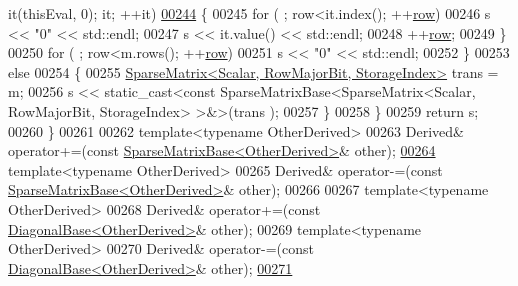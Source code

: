 \begin{DoxyCode}
       it(thisEval, 0); it; ++it)
\hyperlink{group___sparse_core___module_a4d2a17b67327925dc9dab29694f48433}{00244}           \{
00245             \textcolor{keywordflow}{for} ( ; row<it.index(); ++\hyperlink{group___sparse_core___module_ac0a5563ed3f243f013fb9d2c17e230d0}{row})
00246               s << \textcolor{stringliteral}{"0"} << std::endl;
00247             s << it.value() << std::endl;
00248             ++\hyperlink{group___sparse_core___module_ac0a5563ed3f243f013fb9d2c17e230d0}{row};
00249           \}
00250           \textcolor{keywordflow}{for} ( ; row<m.rows(); ++\hyperlink{group___sparse_core___module_ac0a5563ed3f243f013fb9d2c17e230d0}{row})
00251             s << \textcolor{stringliteral}{"0"} << std::endl;
00252         \}
00253         \textcolor{keywordflow}{else}
00254         \{
00255           \hyperlink{group___sparse_core___module_class_eigen_1_1_sparse_matrix}{SparseMatrix<Scalar, RowMajorBit, StorageIndex>} 
      trans = m;
00256           s << static\_cast<const SparseMatrixBase<SparseMatrix<Scalar, RowMajorBit, StorageIndex> >&>(trans
      );
00257         \}
00258       \}
00259       \textcolor{keywordflow}{return} s;
00260     \}
00261 
00262     \textcolor{keyword}{template}<\textcolor{keyword}{typename} OtherDerived>
00263     Derived& operator+=(\textcolor{keyword}{const} \hyperlink{group___sparse_core___module_class_eigen_1_1_sparse_matrix_base}{SparseMatrixBase<OtherDerived>}& other);
\hyperlink{group___sparse_core___module_aa531aefed8ea1fa530c638abc8eea6c9}{00264}     \textcolor{keyword}{template}<\textcolor{keyword}{typename} OtherDerived>
00265     Derived& operator-=(\textcolor{keyword}{const} \hyperlink{group___sparse_core___module_class_eigen_1_1_sparse_matrix_base}{SparseMatrixBase<OtherDerived>}& other);
00266     
00267     \textcolor{keyword}{template}<\textcolor{keyword}{typename} OtherDerived>
00268     Derived& operator+=(\textcolor{keyword}{const} \hyperlink{class_eigen_1_1_diagonal_base}{DiagonalBase<OtherDerived>}& other);
00269     \textcolor{keyword}{template}<\textcolor{keyword}{typename} OtherDerived>
00270     Derived& operator-=(\textcolor{keyword}{const} \hyperlink{class_eigen_1_1_diagonal_base}{DiagonalBase<OtherDerived>}& other);
\hyperlink{group___sparse_core___module_ac66a3a6035f4b89a9e85c0bcaf8a4364}{00271} 

\end{DoxyCode}
